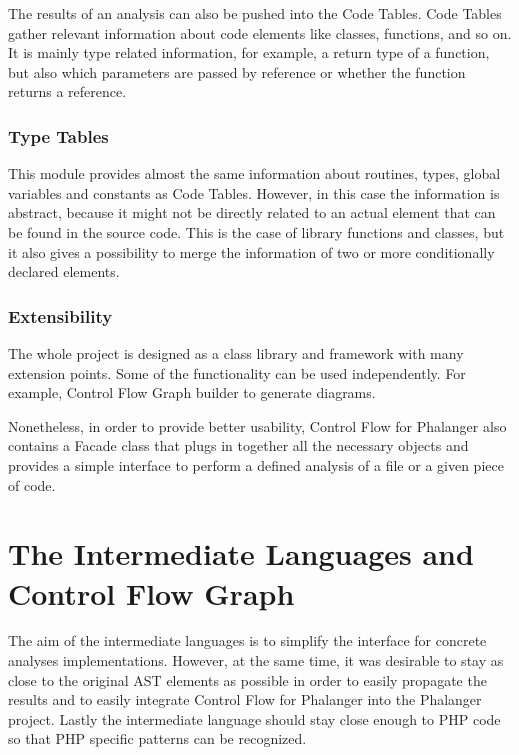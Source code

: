     The results of an analysis can also be pushed into 
    the Code Tables. Code Tables gather relevant information 
    about code elements like classes, functions, and so on. 
    It is mainly type related information, 
    for example, a return type of a function, 
    but also which parameters are passed by reference or 
    whether the function returns a reference.
    
    \subsubsection*{Type Tables} This module provides 
    almost the same information about routines, types, 
    global variables and constants as Code Tables. 
    However, in this case the information 
    is abstract, because it might not be directly related 
    to an actual element that can be found in the source code. 
    This is the case of library functions and classes, 
    but it also gives a possibility to merge the information 
    of two or more conditionally declared elements. 
    
    \subsubsection*{Extensibility}
    The whole project is designed as a class library and 
    framework with many extension points. Some of the 
    functionality can be used independently. For example, 
    Control Flow Graph builder to generate diagrams.
    
    Nonetheless, in order to provide better usability, 
    Control Flow for Phalanger also contains 
    a Facade class  
    that plugs in together all the necessary objects 
    and provides a simple interface to perform a defined 
    analysis of a file or a given piece of code.
    
    \section{The Intermediate Languages and Control Flow Graph}
        The aim of the intermediate languages is to simplify the 
        interface for concrete analyses implementations. 
        However, at the same time, it was desirable to stay as 
        close to the original AST elements as possible in order 
        to easily propagate the results and to easily integrate 
        Control Flow for Phalanger into the Phalanger project.         
        Lastly the intermediate language should stay close enough 
        to PHP code so that PHP specific patterns can be recognized.
        
